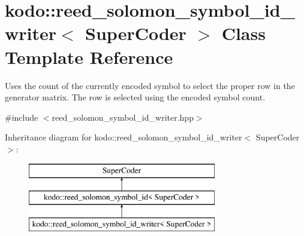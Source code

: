 \hypertarget{classkodo_1_1reed__solomon__symbol__id__writer}{\section{kodo\-:\-:reed\-\_\-solomon\-\_\-symbol\-\_\-id\-\_\-writer$<$ Super\-Coder $>$ Class Template Reference}
\label{classkodo_1_1reed__solomon__symbol__id__writer}
}


Uses the count of the currently encoded symbol to select the proper row in the generator matrix. The row is selected using the encoded symbol count.  




{\ttfamily \#include $<$reed\-\_\-solomon\-\_\-symbol\-\_\-id\-\_\-writer.\-hpp$>$}

Inheritance diagram for kodo\-:\-:reed\-\_\-solomon\-\_\-symbol\-\_\-id\-\_\-writer$<$ Super\-Coder $>$\-:\begin{figure}[H]
\begin{center}
\leavevmode
\includegraphics[height=3.000000cm]{classkodo_1_1reed__solomon__symbol__id__writer}
\end{center}
\end{figure}
